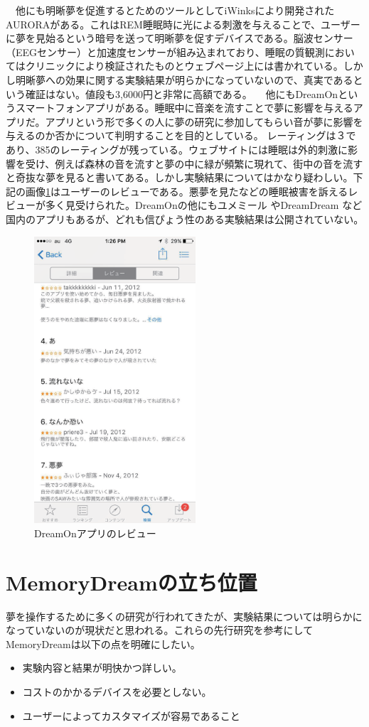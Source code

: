 　他にも明晰夢を促進するとためのツールとしてiWinksにより開発されたAURORAがある。\cite{iWinks}これはREM睡眠時に光による刺激を与えることで、ユーザーに夢を見始るという暗号を送って明晰夢を促すデバイスである。脳波センサー（EEGセンサー）と加速度センサーが組み込まれており、睡眠の質観測においてはクリニックにより検証されたものとウェブページ上には書かれている。しかし明晰夢への効果に関する実験結果が明らかになっていないので、真実であるという確証はない。値段も3,6000円と非常に高額である。
　他にもDreamOnというスマートフォンアプリがある。睡眠中に音楽を流すことで夢に影響を与えるアプリだ。アプリという形で多くの人に夢の研究に参加してもらい音が夢に影響を与えるのか否かについて判明することを目的としている。 \cite{dreamOn}レーティングは３であり、385のレーティングが残っている。ウェブサイトには睡眠は外的刺激に影響を受け、例えば森林の音を流すと夢の中に緑が頻繁に現れて、街中の音を流すと奇抜な夢を見ると書いてある。しかし実験結果についてはかなり疑わしい。下記の画像\ref{DreamOnImage}はユーザーのレビューである。悪夢を見たなどの睡眠被害を訴えるレビューが多く見受けられた。DreamOnの他にもユメミール \cite{yumemiru}やDreamDream \cite{DreamDream}など国内のアプリもあるが、どれも信ぴょう性のある実験結果は公開されていない。

\begin{figure}[htbp]
\begin{center}
\includegraphics[width=6cm]{eps/dreamOn.eps}
\caption{DreamOnアプリのレビュー}
\label{DreamOnImage}
\end{center}
\end{figure}

\section{MemoryDreamの立ち位置}
夢を操作するために多くの研究が行われてきたが、実験結果については明らかになっていないのが現状だと思われる。これらの先行研究を参考にしてMemoryDreamは以下の点を明確にしたい。
\begin{itemize}

\item 実験内容と結果が明快かつ詳しい。
\item コストのかかるデバイスを必要としない。
\item ユーザーによってカスタマイズが容易であること

\end{itemize}